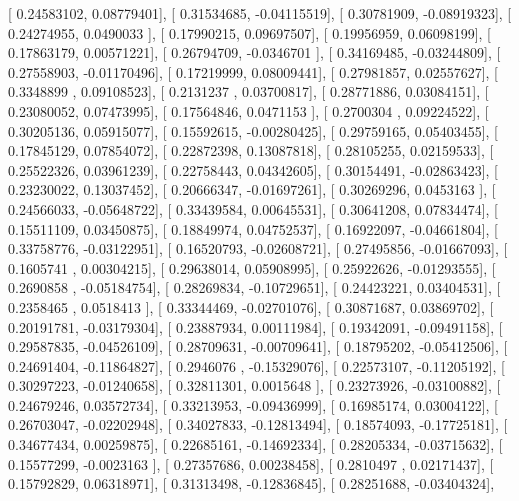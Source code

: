 \documentclass{article}
\begin{document}
       [ 0.24583102,  0.08779401],
       [ 0.31534685, -0.04115519],
       [ 0.30781909, -0.08919323],
       [ 0.24274955,  0.0490033 ],
       [ 0.17990215,  0.09697507],
       [ 0.19956959,  0.06098199],
       [ 0.17863179,  0.00571221],
       [ 0.26794709, -0.0346701 ],
       [ 0.34169485, -0.03244809],
       [ 0.27558903, -0.01170496],
       [ 0.17219999,  0.08009441],
       [ 0.27981857,  0.02557627],
       [ 0.3348899 ,  0.09108523],
       [ 0.2131237 ,  0.03700817],
       [ 0.28771886,  0.03084151],
       [ 0.23080052,  0.07473995],
       [ 0.17564846,  0.0471153 ],
       [ 0.2700304 ,  0.09224522],
       [ 0.30205136,  0.05915077],
       [ 0.15592615, -0.00280425],
       [ 0.29759165,  0.05403455],
       [ 0.17845129,  0.07854072],
       [ 0.22872398,  0.13087818],
       [ 0.28105255,  0.02159533],
       [ 0.25522326,  0.03961239],
       [ 0.22758443,  0.04342605],
       [ 0.30154491, -0.02863423],
       [ 0.23230022,  0.13037452],
       [ 0.20666347, -0.01697261],
       [ 0.30269296,  0.0453163 ],
       [ 0.24566033, -0.05648722],
       [ 0.33439584,  0.00645531],
       [ 0.30641208,  0.07834474],
       [ 0.15511109,  0.03450875],
       [ 0.18849974,  0.04752537],
       [ 0.16922097, -0.04661804],
       [ 0.33758776, -0.03122951],
       [ 0.16520793, -0.02608721],
       [ 0.27495856, -0.01667093],
       [ 0.1605741 ,  0.00304215],
       [ 0.29638014,  0.05908995],
       [ 0.25922626, -0.01293555],
       [ 0.2690858 , -0.05184754],
       [ 0.28269834, -0.10729651],
       [ 0.24423221,  0.03404531],
       [ 0.2358465 ,  0.0518413 ],
       [ 0.33344469, -0.02701076],
       [ 0.30871687,  0.03869702],
       [ 0.20191781, -0.03179304],
       [ 0.23887934,  0.00111984],
       [ 0.19342091, -0.09491158],
       [ 0.29587835, -0.04526109],
       [ 0.28709631, -0.00709641],
       [ 0.18795202, -0.05412506],
       [ 0.24691404, -0.11864827],
       [ 0.2946076 , -0.15329076],
       [ 0.22573107, -0.11205192],
       [ 0.30297223, -0.01240658],
       [ 0.32811301,  0.0015648 ],
       [ 0.23273926, -0.03100882],
       [ 0.24679246,  0.03572734],
       [ 0.33213953, -0.09436999],
       [ 0.16985174,  0.03004122],
       [ 0.26703047, -0.02202948],
       [ 0.34027833, -0.12813494],
       [ 0.18574093, -0.17725181],
       [ 0.34677434,  0.00259875],
       [ 0.22685161, -0.14692334],
       [ 0.28205334, -0.03715632],
       [ 0.15577299, -0.0023163 ],
       [ 0.27357686,  0.00238458],
       [ 0.2810497 ,  0.02171437],
       [ 0.15792829,  0.06318971],
       [ 0.31313498, -0.12836845],
       [ 0.28251688, -0.03404324],
\end{document}
